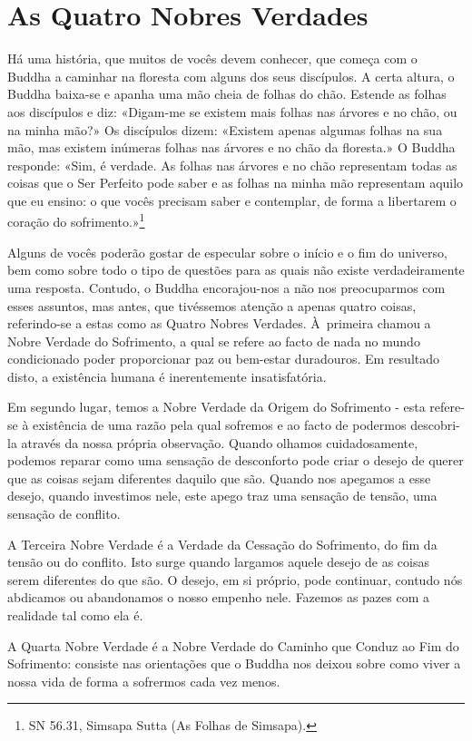 \chapter{As Quatro Nobres Verdades}

Há uma história, que muitos de vocês devem conhecer, que começa com o
Buddha a caminhar na floresta com alguns dos seus discípulos. A certa
altura, o Buddha baixa-se e apanha uma mão cheia de folhas do chão.
Estende as folhas aos discípulos e diz: «Digam-me se existem mais folhas
nas árvores e no chão, ou na minha mão?» Os discípulos dizem: «Existem
apenas algumas folhas na sua mão, mas existem inúmeras folhas nas
árvores e no chão da floresta.» O Buddha responde: «Sim, é verdade. As
folhas nas árvores e no chão representam todas as coisas que o Ser
Perfeito pode saber e as folhas na minha mão representam aquilo que eu
ensino: o que vocês precisam saber e contemplar, de forma a libertarem o
coração do sofrimento.»\footnote{SN 56.31, Simsapa Sutta (As Folhas de
  Simsapa).}

Alguns de vocês poderão gostar de especular sobre o início e o fim do
universo, bem como sobre todo o tipo de questões para as quais não
existe verdadeiramente uma resposta. Contudo, o Buddha encorajou-nos a
não nos preocuparmos com esses assuntos, mas antes, que tivéssemos
atenção a apenas quatro coisas, referindo-se a estas como as Quatro
Nobres Verdades. À~\mbox{primeira} chamou a Nobre Verdade do Sofrimento, a qual
se refere ao facto de nada no mundo condicionado poder proporcionar paz
ou bem-estar duradouros. Em resultado disto, a existência humana é
inerentemente insatisfatória.

Em segundo lugar, temos a Nobre Verdade da Origem do Sofrimento - esta
refere-se à existência de uma razão pela qual sofremos e ao facto de
podermos descobri-la através da nossa própria observação. Quando olhamos
cuidadosamente, podemos reparar como uma sensação de desconforto pode
criar o desejo de querer que as coisas sejam diferentes daquilo que são.
Quando nos apegamos a esse desejo, quando investimos nele, este apego
traz uma sensação de tensão, uma sensação de conflito.

A Terceira Nobre Verdade é a Verdade da Cessação do Sofrimento, do fim
da tensão ou do conflito. Isto surge quando largamos aquele desejo de as
coisas serem diferentes do que são. O desejo, em si próprio, pode
continuar, contudo nós abdicamos ou abandonamos o nosso empenho nele.
Fazemos as pazes com a realidade tal como ela é.

A Quarta Nobre Verdade é a Nobre Verdade do Caminho que Conduz ao Fim do
Sofrimento: consiste nas orientações que o Buddha nos deixou sobre como
viver a nossa vida de forma a sofrermos cada vez menos.

